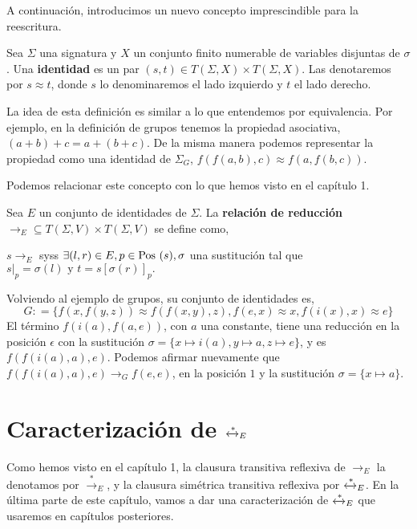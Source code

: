 A continuación, introducimos un nuevo concepto imprescindible para la reescritura.

\begin{defi}
  Sea $\Sigma$ una signatura y $X$ un conjunto finito numerable de variables
  disjuntas de $\sigma$. Una \textbf{identidad} es un par
  $(s,t) \in T(\Sigma, X) \times T(\Sigma, X)$. Las denotaremos por
  $s \approx t$, donde $s$ lo denominaremos el lado izquierdo y $t$ el lado
  derecho.
\end{defi} 

La idea de esta definición es similar a lo que entendemos por
equivalencia. Por ejemplo, en la definición de grupos tenemos la
propiedad asociativa, $(a+b)+c =a+(b+c)$. De la misma manera podemos
representar la propiedad como una identidad de $\Sigma_G$,
$f(f(a,b),c) \approx f(a,f(b,c))$.

Podemos relacionar este concepto con lo que hemos visto en el capítulo 1.

\begin{defi}
  Sea $E$ un conjunto de identidades de $\Sigma$. La \textbf{relación de
  reducción} $\rightarrow_E \subseteq T(\Sigma, V) \times T(\Sigma, V)$
  se define como,
 
  $ s \rightarrow_E$ syss $\exists(l,r) \in E, p \in \mbox{Pos } (s), \sigma$
  una sustitución tal que
  $s|_p = \sigma(l) \text{ y } t= s[\sigma(r)]_p.  $
\end{defi}

Volviendo al ejemplo de grupos, su conjunto de identidades es,
\[
  G : = \{f(x,f(y,z)) \approx f(f(x,y),z), f(e,x) \approx x, f(i(x),x)
  \approx e \}
\]
El término $f(i(a), f(a,e))$, con $a$ una constante, tiene una
reducción en la posición $\epsilon$ con la sustitución
$\sigma = \{x \mapsto i(a), y \mapsto a, z \mapsto e \}$, y es
$f(f(i(a),a),e)$. Podemos afirmar nuevamente que
$f(f(i(a),a),e) \rightarrow_G f(e,e)$, en la posición $1$ y la
sustitución $\sigma = \{x \mapsto a \}$.



\section{Caracterización de $\xleftrightarrow{*}_E$}

Como hemos visto en el capítulo 1, la clausura transitiva reflexiva de
$\rightarrow_E$ la denotamos por $\xrightarrow{*}_E$, y la clausura
simétrica transitiva reflexiva por $\xleftrightarrow{*}_E$. En la
última parte de este capítulo, vamos a dar una caracterización de
$\xleftrightarrow{*}_E$ que usaremos en capítulos posteriores.


